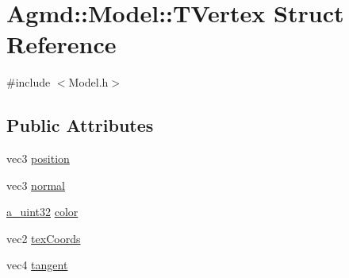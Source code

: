 \hypertarget{struct_agmd_1_1_model_1_1_t_vertex}{\section{Agmd\+:\+:Model\+:\+:T\+Vertex Struct Reference}
\label{struct_agmd_1_1_model_1_1_t_vertex}
}


{\ttfamily \#include $<$Model.\+h$>$}

\subsection*{Public Attributes}
\begin{DoxyCompactItemize}
\item 
vec3 \hyperlink{struct_agmd_1_1_model_1_1_t_vertex_aaae5a46cf2bf6a247e051e40c821a059}{position}
\item 
vec3 \hyperlink{struct_agmd_1_1_model_1_1_t_vertex_aa900dd5188d95b7817a931a80390e8d2}{normal}
\item 
\hyperlink{_common_defines_8h_a964296f9770051b9e4807b1f180dd416}{a\+\_\+uint32} \hyperlink{struct_agmd_1_1_model_1_1_t_vertex_a86afd772c6607b5cbd1c40b9b26f507f}{color}
\item 
vec2 \hyperlink{struct_agmd_1_1_model_1_1_t_vertex_ad157458197a9dd986a435e355e807be9}{tex\+Coords}
\item 
vec4 \hyperlink{struct_agmd_1_1_model_1_1_t_vertex_a083da43ec7dc4e71588f2b9d071ee845}{tangent}
\end{DoxyCompactItemize}



